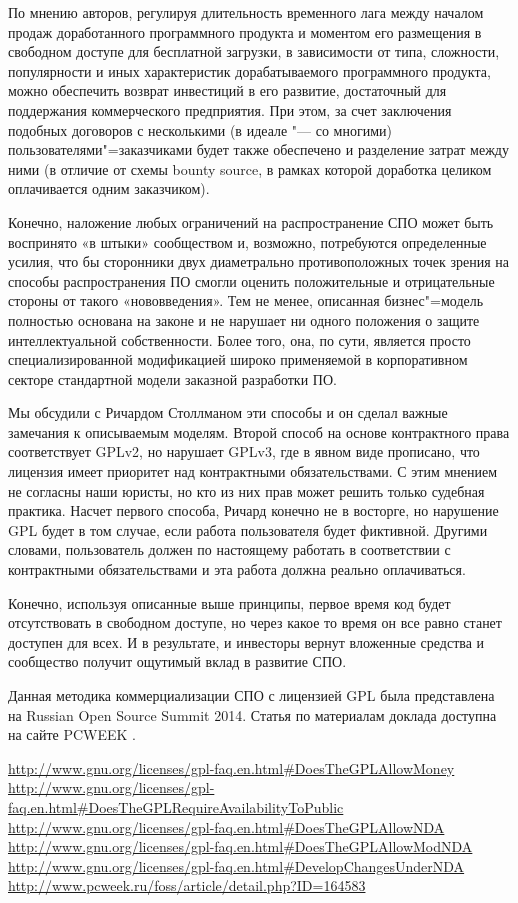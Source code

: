 \documentclass[10pt, a5paper]{article}
\begin{document}
По мнению авторов, регулируя длительность временного лага между началом продаж доработанного программного продукта и моментом его размещения в свободном доступе для бесплатной загрузки, в зависимости от типа, сложности, популярности и иных характеристик дорабатываемого программного продукта, можно обеспечить возврат инвестиций в его развитие, достаточный для поддержания коммерческого предприятия. При этом, за счет заключения подобных договоров с несколькими (в идеале "--- со многими) пользователями"=заказчиками будет также обеспечено и разделение затрат между ними (в отличие от схемы bounty source, в рамках которой доработка целиком оплачивается одним заказчиком).

Конечно, наложение любых ограничений на распространение СПО может быть воспринято «в штыки» сообществом и, возможно, потребуются определенные усилия, что бы сторонники двух диаметрально противоположных точек зрения на способы распространения ПО смогли оценить положительные и отрицательные стороны от такого «нововведения». Тем не менее, описанная бизнес"=модель полностью основана на законе и не нарушает ни одного положения о защите интеллектуальной собственности. Более того, она, по сути, является просто специализированной модификацией широко применяемой в корпоративном секторе стандартной модели заказной разработки ПО.

Мы обсудили с Ричардом Столлманом эти способы и он сделал важные замечания к описываемым моделям. Второй способ на основе контрактного права соответствует GPLv2, но нарушает GPLv3, где в явном виде прописано, что лицензия имеет приоритет над контрактными обязательствами. С этим мнением не согласны наши юристы, но кто из них прав может решить только судебная практика.
Насчет первого способа, Ричард конечно не в восторге, но нарушение GPL будет в том случае, если работа пользователя будет фиктивной. Другими словами, пользователь должен по настоящему работать в соответствии с контрактными обязательствами и эта работа должна реально оплачиваться.

Конечно, используя описанные выше принципы, первое время код будет отсутствовать в свободном доступе, но через какое то время он все равно станет доступен для всех. И в результате, и инвесторы вернут вложенные средства и сообщество получит ощутимый вклад в развитие СПО.

Данная методика коммерциализации СПО с лицензией GPL была представлена на Russian Open Source Summit 2014. Статья по материалам доклада доступна на сайте PCWEEK \cite{ryabikov6}.

\begin{thebibliography}{9}
 \url{http://www.gnu.org/licenses/gpl-faq.en.html#DoesTheGPLAllowMoney}
 \url{http://www.gnu.org/licenses/gpl-faq.en.html#DoesTheGPLRequireAvailabilityToPublic}
 \url{http://www.gnu.org/licenses/gpl-faq.en.html#DoesTheGPLAllowNDA}
 \url{http://www.gnu.org/licenses/gpl-faq.en.html#DoesTheGPLAllowModNDA}
 \url{http://www.gnu.org/licenses/gpl-faq.en.html#DevelopChangesUnderNDA}
 \url{http://www.pcweek.ru/foss/article/detail.php?ID=164583}
\end{thebibliography}
\end{document}
